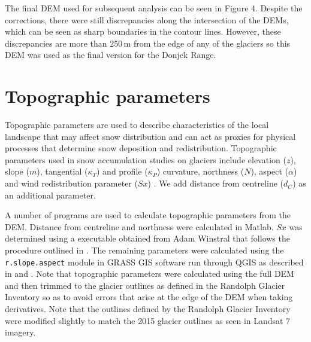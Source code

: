 \documentclass{sfuthesis}
\begin{document}
{The final DEM used for subsequent analysis can be seen in Figure 4. Despite the corrections, there were still discrepancies along the intersection of the DEMs, which can be seen as sharp boundaries in the contour lines. However, these discrepancies are more than 250\,m from the edge of any of the glaciers so this DEM was used as the final version for the Donjek Range.

\begin{figure}[H]
  \label{fig:finalDEM}
\end{figure}

\section{Topographic parameters}
\label{sec:topoCalc}

Topographic parameters are used to describe characteristics of the local landscape that may affect snow distribution and can act as proxies for physical processes that determine snow deposition and redistribution. Topographic parameters used in snow accumulation studies on glaciers include elevation ($z$), slope ($m$), tangential ($\kappa_T$) and profile ($\kappa_P$) curvature, northness ($N$), aspect ($\alpha$) and wind redistribution parameter ($Sx$) \citep{Basist1994, Revuelto2014, McGrath2015}.	We add distance from centreline ($d_C$) as an additional parameter.
 
A number of programs are used to calculate topographic parameters from the DEM. Distance from centreline and northness were calculated in Matlab. $Sx$ was determined using a executable obtained from Adam Winstral that follows the procedure outlined in \cite{Winstral2002}. The remaining parameters were calculated using the \texttt{r.slope.aspect} module in GRASS GIS software run through QGIS as described in \cite{Mitavsova1993} and \cite{Hofierka2009}. Note that topographic parameters were calculated using the full DEM and then trimmed to the glacier outlines as defined in the Randolph Glacier Inventory so as to avoid errors that arise at the edge of the DEM when taking derivatives. Note that the outlines defined by the Randolph Glacier Inventory were modified slightly to match the 2015 glacier outlines as seen in Landsat 7 imagery.

}
\end{document}
